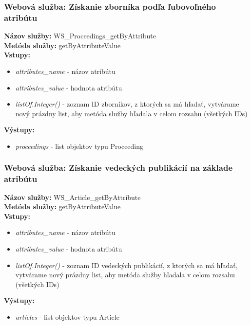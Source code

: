 \documentclass[10pt,oneside,slovak,a4paper]{article}
\begin{document}
\subsubsection{Webová služba: Získanie zborníka podľa ľubovoľného atribútu}
\textbf{Názov služby:} WS\_Proceedings\_getByAttribute\\
\textbf{Metóda služby:} getByAttributeValue\\
\textbf{Vstupy:}
	\begin{itemize}
		\item \textit{attributes\_name} - názov atribútu
		\item \textit{attributes\_value} - hodnota atribútu
		\item \textit{listOf.Integer()} - zoznam ID zborníkov, z ktorých sa má hľadať, vytvárame nový prázdny list, aby metóda služby hľadala v celom rozsahu (všetkých IDs)
	\end{itemize}
\textbf{Výstupy:}
	\begin{itemize}
		\item \textit{proceedings} - list objektov typu Proceeding
	\end{itemize}
	
\subsubsection{Webová služba: Získanie vedeckých publikácií na základe atribútu}
\textbf{Názov služby:} WS\_Article\_getByAttribute\\
\textbf{Metóda služby:} getByAttributeValue\\
\textbf{Vstupy:}
	\begin{itemize}
		\item \textit{attributes\_name} - názov atribútu
		\item \textit{attributes\_value} - hodnota atribútu
		\item \textit{listOf.Integer()} - zoznam ID vedeckých publikácií, z ktorých sa má hľadať, vytvárame nový prázdny list, aby metóda služby hľadala v celom rozsahu (všetkých IDs)
	\end{itemize}
\textbf{Výstupy:}
	\begin{itemize}
		\item \textit{articles} - list objektov typu Article
	\end{itemize}
	
\end{document}
